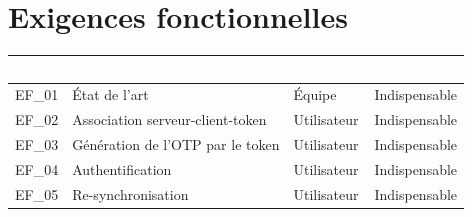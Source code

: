 \documentclass{"../../res/univ-projet"}
\begin{document}
\section{Exigences fonctionnelles}
\begin{tabular}{|c|l|l|c|}
    \hline
    \rowcolor{gray}
    \textcolor{white}{Id} & \textcolor{white}{Intitulé} & \textcolor{white}{Acteur(s)} & \textcolor{white}{Priorité}\\
    \hline
    EF\_01 & État de l'art & Équipe & Indispensable\\
    \hline
    EF\_02 & Association serveur-client-token & Utilisateur & Indispensable\\
    \hline
    EF\_03 & Génération de l'OTP par le token & Utilisateur & Indispensable\\
    \hline
    EF\_04 & Authentification & Utilisateur & Indispensable\\
    \hline
    EF\_05 & Re-synchronisation & Utilisateur & Indispensable\\
    \hline
\end{tabular}\
\end{document}
